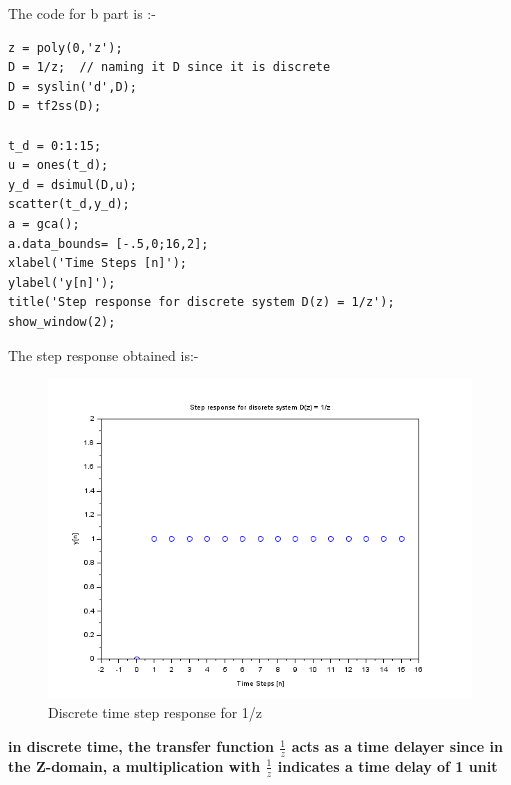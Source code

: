 \documentclass[12pt]{article}
\begin{document}
The code for b part is :-
\begin{verbatim}
z = poly(0,'z');
D = 1/z;  // naming it D since it is discrete
D = syslin('d',D);
D = tf2ss(D);

t_d = 0:1:15;
u = ones(t_d);
y_d = dsimul(D,u);
scatter(t_d,y_d);
a = gca();
a.data_bounds= [-.5,0;16,2];
xlabel('Time Steps [n]');
ylabel('y[n]');
title('Step response for discrete system D(z) = 1/z');
show_window(2);
    \end{verbatim}   
 The step response obtained is:-
    \begin{figure}[H]
        \centering
        \includegraphics[scale=0.8]{q4_b.png}
        \caption{Discrete time step response for 1/z}
        \label{fig:my_label}
    \end{figure}
\textbf{in discrete time, the transfer function $\frac{1}{z}$ acts as a time delayer since in the Z-domain, a multiplication with $\frac{1}{z}$ indicates a time delay of 1 unit}
\end{document}
